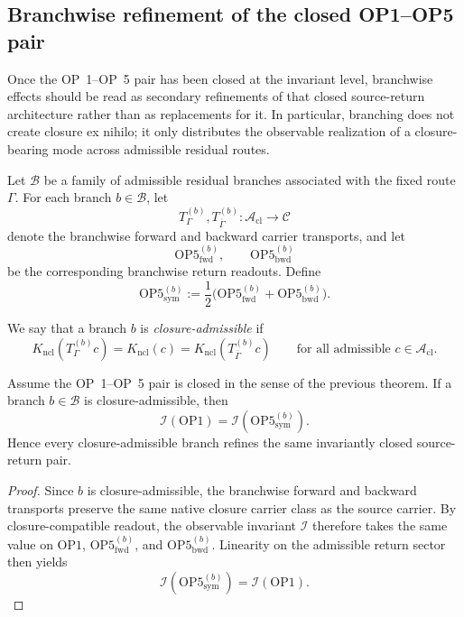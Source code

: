 \subsection{Branchwise refinement of the closed OP1--OP5 pair}

Once the OP~1--OP~5 pair has been closed at the invariant level, branchwise effects should be read as secondary refinements of that closed source-return architecture rather than as replacements for it. In particular, branching does not create closure ex nihilo; it only distributes the observable realization of a closure-bearing mode across admissible residual routes.

Let $\mathcal{B}$ be a family of admissible residual branches associated with the fixed route $\Gamma$. For each branch $b\in\mathcal{B}$, let
\[
T_{\Gamma}^{(b)},T_{\overline{\Gamma}}^{(b)}:\mathcal{A}_{\mathrm{cl}}\to\mathcal{C}
\]
denote the branchwise forward and backward carrier transports, and let
\[
\mathrm{OP5}^{(b)}_{\mathrm{fwd}},
\qquad
\mathrm{OP5}^{(b)}_{\mathrm{bwd}}
\]
be the corresponding branchwise return readouts. Define
\[
\mathrm{OP5}^{(b)}_{\mathrm{sym}}
:=
\frac12\bigl(\mathrm{OP5}^{(b)}_{\mathrm{fwd}}+\mathrm{OP5}^{(b)}_{\mathrm{bwd}}\bigr).
\]

We say that a branch $b$ is \emph{closure-admissible} if
\[
K_{\mathrm{ncl}}(T_{\Gamma}^{(b)}c)
=
K_{\mathrm{ncl}}(c)
=
K_{\mathrm{ncl}}(T_{\overline{\Gamma}}^{(b)}c)
\qquad
\text{for all admissible } c\in\mathcal{A}_{\mathrm{cl}}.
\]

\begin{proposition}\label{prop:op-branchwise-refinement}
Assume the OP~1--OP~5 pair is closed in the sense of the previous theorem. If a branch $b\in\mathcal{B}$ is closure-admissible, then
\[
\mathcal{I}(\mathrm{OP1})
=
\mathcal{I}(\mathrm{OP5}^{(b)}_{\mathrm{sym}}).
\]
Hence every closure-admissible branch refines the same invariantly closed source-return pair.
\end{proposition}

\begin{proof}
Since $b$ is closure-admissible, the branchwise forward and backward transports preserve the same native closure carrier class as the source carrier. By closure-compatible readout, the observable invariant $\mathcal{I}$ therefore takes the same value on $\mathrm{OP1}$, $\mathrm{OP5}^{(b)}_{\mathrm{fwd}}$, and $\mathrm{OP5}^{(b)}_{\mathrm{bwd}}$. Linearity on the admissible return sector then yields
\[
\mathcal{I}(\mathrm{OP5}^{(b)}_{\mathrm{sym}})
=
\mathcal{I}(\mathrm{OP1}).
\]
\end{proof}

